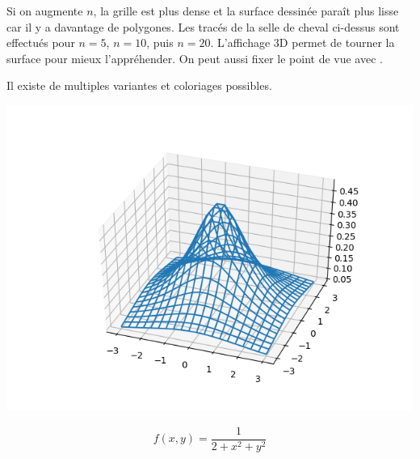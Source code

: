 \documentclass[11pt,class=report,crop=false]{standalone}
\begin{document}
Si on augmente $n$, la grille est plus dense et la surface dessinée   paraît plus lisse car il y a davantage de polygones. Les tracés de la \og{}selle de cheval\fg{} ci-dessus sont effectués pour $n=5$, $n=10$, puis $n=20$. L'affichage 3D permet de tourner la surface pour mieux l'appréhender. On peut aussi fixer le point de vue avec .

Il existe de multiples variantes et coloriages possibles.

\begin{minipage}{0.45\textwidth}
\begin{center}
\includegraphics[scale=\myscale,scale=0.6]{figures/pythonxy-surface-1}
\end{center}
\end{minipage}
\begin{minipage}{0.45\textwidth}
\begin{center}
$$f(x,y) = \frac{1}{2+x^2+y^2}$$

\end{center}
\end{minipage}
\end{document}
